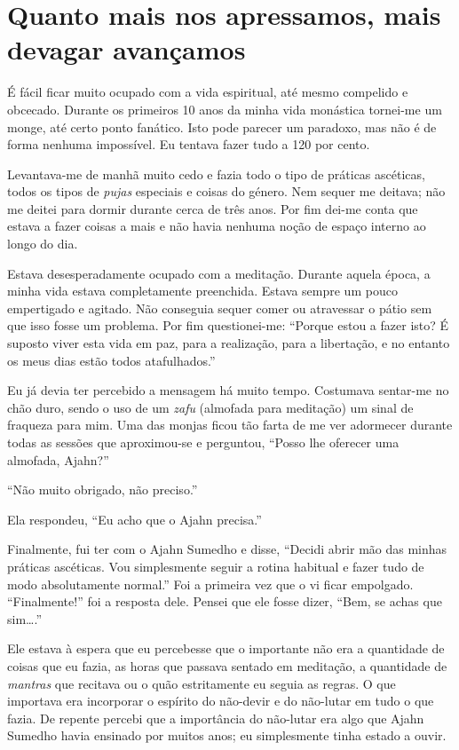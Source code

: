\section{Quanto mais nos apressamos, mais devagar avançamos}

É fácil ficar muito ocupado com a vida espiritual, até mesmo compelido e
obcecado. Durante os primeiros 10 anos da minha vida monástica tornei-me
um monge, até certo ponto fanático. Isto pode parecer um paradoxo, mas
não é de forma nenhuma impossível. Eu tentava fazer tudo a 120 por
cento.

Levantava-me de manhã muito cedo e fazia todo o tipo de práticas
ascéticas, todos os tipos de \emph{pujas} especiais e coisas do género.
Nem sequer me deitava; não me deitei para dormir durante cerca de três
anos. Por fim dei-me conta que estava a fazer coisas a mais e não havia
nenhuma noção de espaço interno ao longo do dia.

Estava desesperadamente ocupado com a meditação. Durante aquela época, a
minha vida estava completamente preenchida. Estava sempre um pouco
empertigado e agitado. Não conseguia sequer comer ou atravessar o pátio
sem que isso fosse um problema. Por fim questionei-me: ``Porque estou a
fazer isto? É suposto viver esta vida em paz, para a realização, para a
libertação, e no entanto os meus dias estão todos atafulhados.''

Eu já devia ter percebido a mensagem há muito tempo. Costumava sentar-me
no chão duro, sendo o uso de um \emph{zafu} (almofada para meditação) um
sinal de fraqueza para mim. Uma das monjas ficou tão farta de me ver
adormecer durante todas as sessões que aproximou-se e perguntou, ``Posso
lhe oferecer uma almofada, Ajahn?''

``Não muito obrigado, não preciso.''

Ela respondeu, ``Eu acho que o Ajahn precisa.''

Finalmente, fui ter com o Ajahn Sumedho e disse, ``Decidi abrir mão das
minhas práticas ascéticas. Vou simplesmente seguir a rotina habitual e
fazer tudo de modo absolutamente normal.'' Foi a primeira vez que o vi
ficar empolgado. ``Finalmente!'' foi a resposta dele. Pensei que ele
fosse dizer, ``Bem, se achas que sim\ldots{}.''

Ele estava à espera que eu percebesse que o importante não era a
quantidade de coisas que eu fazia, as horas que passava sentado em
meditação, a quantidade de \emph{mantras} que recitava ou o quão
estritamente eu seguia as regras. O que importava era incorporar o
espírito do não-devir e do não-lutar em tudo o que fazia. De repente
percebi que a importância do não-lutar era algo que Ajahn Sumedho havia
ensinado por muitos anos; eu simplesmente tinha estado a ouvir.

